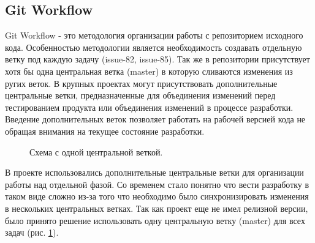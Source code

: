 \subsection{Git Workflow}
Git Workflow - это методология организации работы с репозиторием исходного кода.
Особенностью методологии является необходимость создавать отдельную ветку под
каждую задачу (issue-82, issue-85). Так же в репозитории присутствует хотя бы
одна центральная ветка (master) в которую сливаются изменения из ругих веток. В
крупных проектах могут присутствовать дополнительные центральные ветки,
предназначенные для объединения изменений перед тестированием продукта или
объединения изменений в процессе разработки. Введение дополнительных веток
позволяет работать на рабочей версией кода не обращая внимания на текущее
состояние разработки.

\begin{figure}[h]
\caption{Схема с одной центральной веткой.}
\label{ris:one_central_branch}
\end{figure}

В проекте использовались дополнительные центральные ветки для организации работы
над отдельной фазой. Со временем стало понятно что вести разработку в таком виде
сложно из-за того что необходимо было синхронизировать изменения в нескольких
центральных ветках. Так как проект еще не имел релизной версии, было принято
решение использовать одну центральную ветку (master) для всех задач (рис.
\ref{ris:one_central_branch}).
